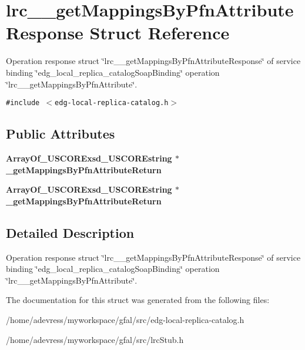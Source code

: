 \section{lrc\_\-\_\-get\-Mappings\-By\-Pfn\-Attribute\-Response Struct Reference}
\label{structlrc____getMappingsByPfnAttributeResponse}
Operation response struct \char`\"{}lrc\_\-\_\-get\-Mappings\-By\-Pfn\-Attribute\-Response\char`\"{} of service binding \char`\"{}edg\_\-local\_\-replica\_\-catalog\-Soap\-Binding\char`\"{} operation \char`\"{}lrc\_\-\_\-get\-Mappings\-By\-Pfn\-Attribute\char`\"{}.  


{\tt \#include $<$edg-local-replica-catalog.h$>$}

\subsection*{Public Attributes}
\begin{CompactItemize}
\item 
\bf{Array\-Of\_\-USCORExsd\_\-USCOREstring} $\ast$ \textbf{\_\-get\-Mappings\-By\-Pfn\-Attribute\-Return}\label{structlrc____getMappingsByPfnAttributeResponse_65c7fecb378f7a2707c8d5e2ea7d829b}

\item 
\bf{Array\-Of\_\-USCORExsd\_\-USCOREstring} $\ast$ \textbf{\_\-get\-Mappings\-By\-Pfn\-Attribute\-Return}\label{structlrc____getMappingsByPfnAttributeResponse_65c7fecb378f7a2707c8d5e2ea7d829b}

\end{CompactItemize}


\subsection{Detailed Description}
Operation response struct \char`\"{}lrc\_\-\_\-get\-Mappings\-By\-Pfn\-Attribute\-Response\char`\"{} of service binding \char`\"{}edg\_\-local\_\-replica\_\-catalog\-Soap\-Binding\char`\"{} operation \char`\"{}lrc\_\-\_\-get\-Mappings\-By\-Pfn\-Attribute\char`\"{}. 



The documentation for this struct was generated from the following files:\begin{CompactItemize}
\item 
/home/adevress/myworkspace/gfal/src/edg-local-replica-catalog.h\item 
/home/adevress/myworkspace/gfal/src/lrc\-Stub.h\end{CompactItemize}
